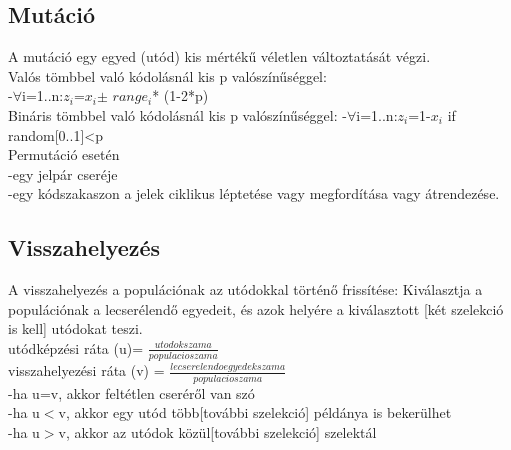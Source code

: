 \documentclass{article}
\begin{document}
	 \subsection{Mutáció}
	 A mutáció egy egyed (utód) kis mértékű véletlen változtatását végzi.\\
	 Valós tömbbel való kódolásnál kis p valószínűséggel:\\
	 -$\forall$i=1..n:$z_i$=$x_i$$\pm$ $range_i$* (1-2*p)\\
	 Bináris tömbbel való kódolásnál kis p valószínűséggel:
	 -$\forall$i=1..n:$z_i$=1-$x_i$ if random[0..1]<p\\
	 Permutáció esetén\\
	 -egy jelpár cseréje\\
	 -egy kódszakaszon a jelek ciklikus léptetése vagy megfordítása vagy átrendezése.\\
	 
	 \newpage
	 \subsection{Visszahelyezés}
	 A visszahelyezés a populációnak az utódokkal történő frissítése: Kiválasztja a populációnak a lecserélendő egyedeit, és azok helyére a kiválasztott [két szelekció is kell] utódokat teszi.\\
	 utódképzési ráta (u)= $\frac{utodok szama}{populacio szama}$\\
	 visszahelyezési ráta (v) = $\frac{lecserelendo egyedek szama}{populacio szama}$\\
	 -ha u=v, akkor feltétlen cseréről van szó\\
	 -ha u$<$v, akkor egy utód több[további szelekció] példánya is bekerülhet\\
	 -ha u$>$v, akkor az utódok közül[további szelekció] szelektál
	 
	
		
\end{document}
